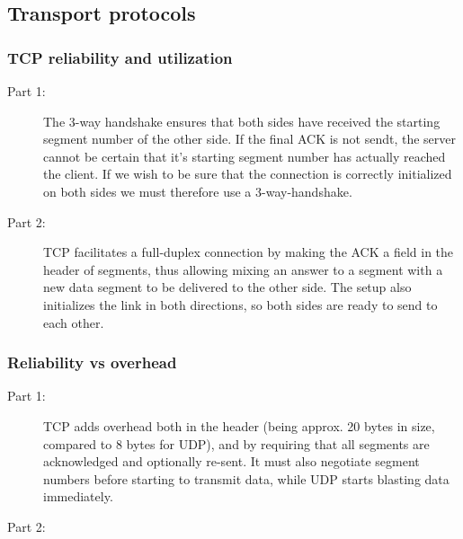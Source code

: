 \subsection{Transport protocols}
\subsubsection{TCP reliability and utilization}
\begin{description}
    \item[Part 1:] The 3-way handshake ensures that both sides have received the starting segment number of the other side.
        If the final ACK is not sendt, the server cannot be certain that it's starting segment number has actually
        reached the client. If we wish to be sure that the connection is correctly initialized on both sides we must
        therefore use a 3-way-handshake.
    \item[Part 2:] TCP facilitates a full-duplex connection by making the ACK a field in the header of segments, thus
        allowing mixing an answer to a segment with a new data segment to be delivered to the other side. The setup also
        initializes the link in both directions, so both sides are ready to send to each other.
\end{description}

\subsubsection{Reliability vs overhead}
\begin{description}
    \item[Part 1:] TCP adds overhead both in the header (being approx. 20 bytes in size, compared to 8 bytes for UDP), and
        by requiring that all segments are acknowledged and optionally re-sent. It must also negotiate segment numbers before
        starting to transmit data, while UDP starts blasting data immediately.
    \item[Part 2:] 
\end{description}

